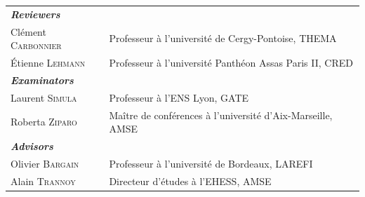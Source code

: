 \small
\begin{tabular}{ll}
\itshape \bfseries Reviewers &   \\
Clément \textsc{Carbonnier}     & Professeur à l'université de Cergy-Pontoise, THEMA\\
Étienne \textsc{Lehmann}  &   Professeur à l'université Panthéon Assas Paris II, CRED \\
\itshape \bfseries Examinators  &     \\
Laurent \textsc{Simula} & Professeur à l'ENS Lyon, GATE\\
Roberta \textsc{Ziparo} & Ma\^itre de conférences à l'université d'Aix-Marseille, AMSE\\
\itshape \bfseries Advisors  &   \\
Olivier \textsc{Bargain} &   Professeur à l'université de Bordeaux, LAREFI \\
Alain \textsc{Trannoy}   &   Directeur d’études à l'EHESS, AMSE \\ 
\end{tabular}
\normalsize








\newpage
\thispagestyle{empty}
\mbox{}

\newpage

\thispagestyle{empty}


